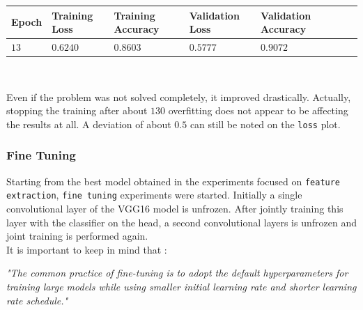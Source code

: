 \documentclass[11pt,a4paper]{article}
\begin{document}
\begin{center}
\hspace*{-0.8cm}
\begin{tabular}{|p{1.2cm}|p{1.8cm}|p{2cm}|p{2cm}|p{2cm}|p{2cm}|p{2cm}|}
\rowcolor{gray!50}
\hline
\textbf{Epoch} & \textbf{Training Loss} & \textbf{Training Accuracy} & \textbf{Validation Loss} & \textbf{Validation Accuracy}\\
\hline
$13$ & $0.6240$ & $0.8603$ & $0.5777$ & $0.9072$\\
\hline
\end{tabular}\\
\end{center}
Even if the problem was not solved completely, it improved drastically. Actually, stopping the training after about $130$ overfitting does not appear to be affecting the results at all. A deviation of about $0.5$ can still be noted on the \texttt{loss} plot.
\subsubsection{Fine Tuning}
Starting from the best model obtained in the experiments focused on \texttt{feature extraction}, \texttt{fine tuning} experiments were started. Initially a single convolutional layer of the VGG16 model is unfrozen. After jointly training this layer with the classifier on the head, a second convolutional layers is unfrozen and joint training is performed again.\\
It is important to keep in mind that \cite{DBLP:journals/corr/abs-2002-11770}:
\begin{displayquote}
\textit{"The common practice of fine-tuning is to adopt the default hyperparameters for training large models while using smaller initial learning rate and shorter learning rate schedule."}
\end{displayquote}
\end{document}
